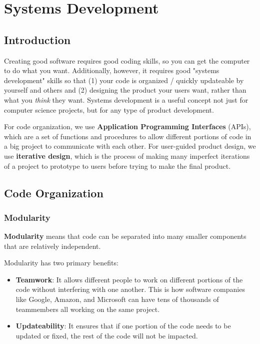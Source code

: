 \chapter{Systems Development}

\section{Introduction}
Creating good software requires good coding skills, so you can get the computer to do what you want. Additionally, however, it requires good "systems development" skills so that (1) your code is organized / quickly updateable by yourself and others and (2) designing the product your users want, rather than what you \emph{think} they want. Systems development is a useful concept not just for computer science projects, but for any type of product development. 

For code organization, we use \textbf{Application Programming Interfaces} (APIs), which are a set of functions and procedures to allow different portions of code in a big project to communicate with each other. For user-guided product design, we use \textbf{iterative design}, which is the process of making many imperfect iterations of a project to prototype to users before trying to make the final product. 

\section{Code Organization}

 \subsection{Modularity}
 \begin{definition}
 \textbf{Modularity} means that code can be separated into many smaller components that are relatively independent. 
 \end{definition}
 
Modularity has two primary benefits:
\begin{itemize}
\item \textbf{Teamwork}: It allows different people to work on different portions of the code without interfering with one another. This is how software companies like Google, Amazon, and Microsoft can have tens of thousands of teammembers all working on the same project.
\item \textbf{Updateability}: It ensures that if one portion of the code needs to be updated or fixed, the rest of the code will not be impacted. 
\end{itemize} 

